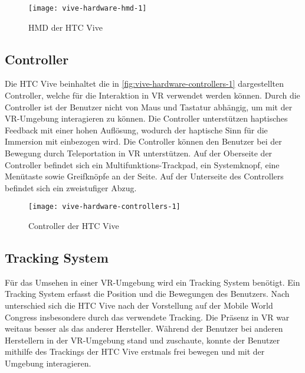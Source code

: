 \begin{figure}[!htbp]
	\centering
	\texttt{[image: vive-hardware-hmd-1]}
	\caption[HMD der HTC Vive]{\acs{HMD} der HTC Vive \cite{ViveHMD}}
	\label{fig:vive-hardware-hmd-1}
\end{figure}

\subsection{Controller}
Die HTC Vive beinhaltet die in \autoref{fig:vive-hardware-controllers-1} dargestellten Controller, welche für die Interaktion in \ac{VR} verwendet werden können. Durch die Controller ist der Benutzer nicht von Maus und Tastatur abhängig, um mit der \ac{VR}-Umgebung interagieren zu können. Die Controller unterstützen haptisches Feedback mit einer hohen Auflösung, wodurch der haptische Sinn für die Immersion mit einbezogen wird. Die Controller können den Benutzer bei der Bewegung durch Teleportation in \ac{VR} unterstützen. Auf der Oberseite der Controller befindet sich ein Multifunktions-Trackpad, ein Systemknopf, eine Menütaste sowie Greifknöpfe an der Seite. Auf der Unterseite des Controllers befindet sich ein zweistufiger Abzug. \cite{ViveProduct}

\begin{figure}[!htbp]
	\centering
	\texttt{[image: vive-hardware-controllers-1]}
	\caption[Controller der HTC Vive]{Controller der HTC Vive \cite{ViveControllers}}
	\label{fig:vive-hardware-controllers-1}
\end{figure}

\subsection{Tracking System}
Für das Umsehen in einer \ac{VR}-Umgebung wird ein Tracking System benötigt. Ein Tracking System erfasst die Position und die Bewegungen des Benutzers. Nach \citeauthor{Sauter.2015} unterschied sich die HTC Vive nach der Vorstellung auf der Mobile World Congress insbesondere durch das verwendete Tracking. Die Präsenz in \ac{VR} war weitaus besser als das anderer Hersteller. Während der Benutzer bei anderen Herstellern in der \ac{VR}-Umgebung stand und zuschaute, konnte der Benutzer mithilfe des Trackings der HTC Vive erstmals frei bewegen und mit der Umgebung interagieren. \cite{Sauter.2015} 


